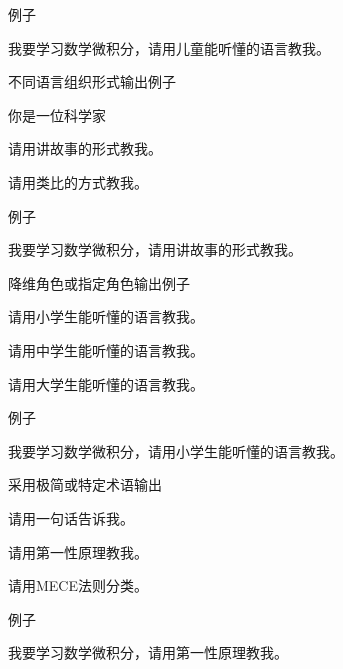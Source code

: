 \documentclass[12pt]{book}
\begin{document}
 
 例子
 	\begin{tcolorbox}
我要学习数学微积分，请用儿童能听懂的语言教我。
 \end{tcolorbox}
 
 不同语言组织形式输出例子
 	\begin{tcolorbox}
 	你是一位科学家
 \end{tcolorbox}
 
  	\begin{tcolorbox}
请用讲故事的形式教我。
 \end{tcolorbox}
  		 
  	\begin{tcolorbox}
请用类比的方式教我。
\end{tcolorbox}  		 
  		 
 例子
   	
  	\begin{tcolorbox}
我要学习数学微积分，请用讲故事的形式教我。
\end{tcolorbox}  	

降维角色或指定角色输出例子
  	\begin{tcolorbox}
请用小学生能听懂的语言教我。
\end{tcolorbox}  	


  	\begin{tcolorbox}
请用中学生能听懂的语言教我。
\end{tcolorbox}  	


  	\begin{tcolorbox}
请用大学生能听懂的语言教我。
\end{tcolorbox}  	

 例子
  	\begin{tcolorbox}
我要学习数学微积分，请用小学生能听懂的语言教我。
\end{tcolorbox}  	


采用极简或特定术语输出
  	\begin{tcolorbox}
请用一句话告诉我。
\end{tcolorbox}  	


  	\begin{tcolorbox}
请用第一性原理教我。
\end{tcolorbox}  	


  	\begin{tcolorbox}
请用MECE法则分类。
\end{tcolorbox}  	


 例子

 \begin{tcolorbox}
我要学习数学微积分，请用第一性原理教我。
\end{tcolorbox}  	
  		 
\end{document}
